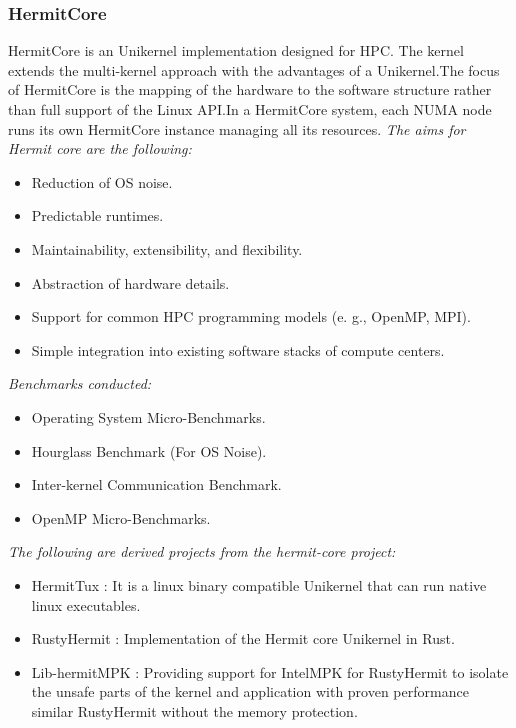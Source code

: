 \subsubsection{HermitCore \cite{HermitCore}}
HermitCore is an Unikernel implementation designed for HPC. The kernel extends the
multi-kernel approach with the advantages of a Unikernel.The focus of HermitCore is 
the mapping of the hardware to
the software structure rather than full support of the Linux
API.In a HermitCore system, each NUMA node runs its own HermitCore instance managing all its resources.
\emph{The aims for Hermit core are the following:}
\begin{itemize}
  \item Reduction of OS noise.
  \item Predictable runtimes.
  \item Maintainability, extensibility, and flexibility.
  \item Abstraction of hardware details.
  \item Support for common HPC programming models (e. g.,
  OpenMP, MPI).
  \item Simple integration into existing software stacks of
  compute centers.
\end{itemize}
\emph{Benchmarks conducted:}
\begin{itemize}
  \item Operating System Micro-Benchmarks.
  \item Hourglass Benchmark (For OS Noise).
  \item Inter-kernel Communication Benchmark.
  \item OpenMP Micro-Benchmarks.
\end{itemize}
\emph{The following are derived projects from the hermit-core project:}
\begin{itemize}
  \item HermitTux \cite{Hermitux} : It is a linux binary compatible Unikernel that can run native linux executables. 
  \item RustyHermit \cite{RustyHermit}: Implementation of the Hermit core Unikernel in Rust. 
  \item Lib-hermitMPK \cite{HermitMPK} : Providing support for IntelMPK for RustyHermit to isolate the unsafe parts of the kernel and 
  application with proven performance similar RustyHermit without the memory protection.
\end{itemize}

